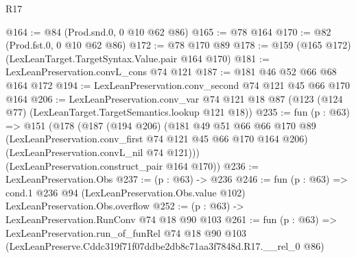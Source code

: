 \begin{lexlean}{R17}
\begin{coremodule}
@164 := @84 (Prod.snd.{0, 0} @10 @62 @86)
@165 := @78 @164
@170 := @82 (Prod.fst.{0, 0} @10 @62 @86)
@172 := @78 @170 @89
@178 := @159 (@165 @172) (LexLeanTarget.TargetSyntax.Value.pair @164 @170)
@181 := LexLeanPreservation.convL_cons @74 @121
@187 := @181 @46 @52 @66 @68 @164 @172
@194 := LexLeanPreservation.conv_second @74 @121 @45 @66 @170 @164
@206 := LexLeanPreservation.conv_var
    @74
    @121
    @18
    @87
    (@123 (@124 @77) (LexLeanTarget.TargetSemantics.lookup @121 @18))
@235 := fun (p : @63) =>
  @151
    (@178
      (@187
        (@194 @206)
        (@181
          @49
          @51
          @66
          @66
          @170
          @89
          (LexLeanPreservation.conv_first @74 @121 @45 @66 @170 @164 @206)
          (LexLeanPreservation.convL_nil @74 @121)))
      (LexLeanPreservation.construct_pair @164 @170))
@236 := LexLeanPreservation.Obs
@237 := (p : @63) -> @236
@246 := fun (p : @63) =>
  cond.{1} @236 @94 (LexLeanPreservation.Obs.value @102) LexLeanPreservation.Obs.overflow
@252 := (p : @63) -> LexLeanPreservation.RunConv @74 @18 @90 @103
@261 := fun (p : @63) =>
  LexLeanPreservation.run_of_funRel
    @74
    @18
    @90
    @103
    (LexLeanPreserve.Cddc319f71f07ddbe2db8c71aa3f7848d.R17.__rel_0 @86)
\end{coremodule}
\end{lexlean}
